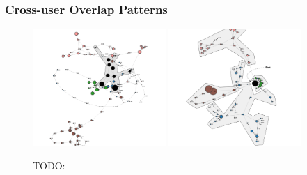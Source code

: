 \subsubsection{Cross-user Overlap Patterns}

\begin{figure}[H]
    \centering
    \includegraphics[width=0.45\textwidth]{figures/overlap1}
    \includegraphics[width=0.45\textwidth]{figures/overlap2}
    \caption{TODO:}
    \label{fig:overlap}
\end{figure}



\cleardoublepage